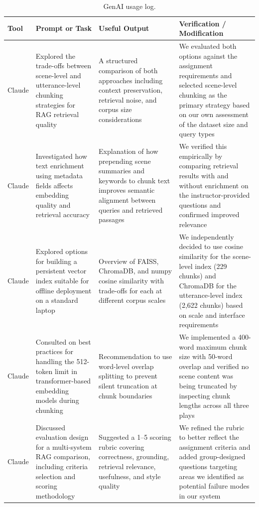 \documentclass[10pt,conference]{IEEEtran}
\begin{document}
\label{app:genai-log}
\begin{table}[p]
\centering
\caption{GenAI usage log.}
\label{tab:genai-log}
\begin{tabularx}{\textwidth}{p{1.5cm} p{3.5cm} p{3.5cm} X}
\toprule
Tool & Prompt or Task & Useful Output & Verification / Modification \\
\midrule
 
Claude &
Explored the trade-offs between scene-level and utterance-level
chunking strategies for RAG retrieval quality &
A structured comparison of both approaches including context
preservation, retrieval noise, and corpus size considerations &
We evaluated both options against the assignment requirements and
selected scene-level chunking as the primary strategy based on
our own assessment of the dataset size and query types \\
 
Claude &
Investigated how text enrichment using metadata fields affects
embedding quality and retrieval accuracy &
Explanation of how prepending scene summaries and keywords to chunk
text improves semantic alignment between queries and retrieved passages &
We verified this empirically by comparing retrieval results with and
without enrichment on the instructor-provided questions and confirmed
improved relevance \\
 
Claude &
Explored options for building a persistent vector index suitable for
offline deployment on a standard laptop &
Overview of FAISS, ChromaDB, and numpy cosine similarity with
trade-offs for each at different corpus scales &
We independently decided to use cosine similarity for the scene-level
index (229 chunks) and ChromaDB for the utterance-level index (2,622
chunks) based on scale and interface requirements \\
 
Claude &
Consulted on best practices for handling the 512-token limit in
transformer-based embedding models during chunking &
Recommendation to use word-level overlap splitting to prevent silent
truncation at chunk boundaries &
We implemented a 400-word maximum chunk size with 50-word overlap and
verified no scene content was being truncated by inspecting chunk
lengths across all three plays \\
 
Claude &
Discussed evaluation design for a multi-system RAG comparison,
including criteria selection and scoring methodology &
Suggested a 1--5 scoring rubric covering correctness, grounding,
retrieval relevance, usefulness, and style quality &
We refined the rubric to better reflect the assignment criteria and
added group-designed questions targeting areas we identified as
potential failure modes in our system \\
 

\end{tabularx}
\end{table}
\end{document}
